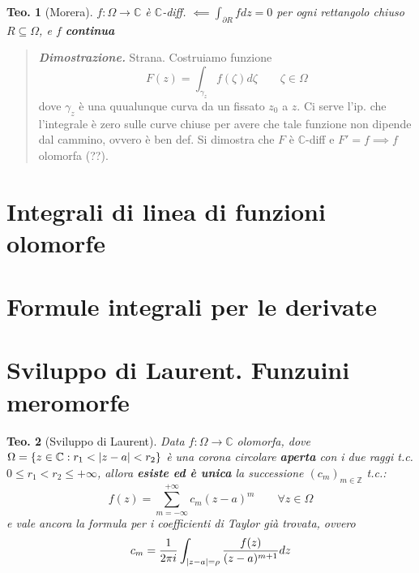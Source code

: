 \documentclass[a4paper,10pt]{article}
\newcommand{\im}{\mathbb{C}} %
\theoremstyle{indentdefinition}
\theoremstyle{indenttheorem}
\newtheorem{thm}{Teo.}
\theoremstyle{myremark}
\theoremstyle{indentgeneral}
\newenvironment{dimo}{\begin{quote}\textit{\textbf{Dimostrazione.}}}{\end{quote}} %
\begin{document}
\begin{thm}[Morera] $f:\Omega\to\im$ è $\im$-diff. $\impliedby\int_{\partial R}fdz=0$ per ogni rettangolo chiuso $R\subseteq \Omega$, e $f$ \textbf{continua}
\end{thm}

\begin{dimo}
    Strana. Costruiamo funzione
    $$F(z)=\int_{\gamma_z}f(\zeta)d\zeta \quad \quad \zeta\in\Omega$$
    dove $\gamma_z$ è una quualunque curva da un fissato $z_0$ a $z$. Ci serve l'ip. che l'integrale è zero sulle curve chiuse per avere che tale  funzione non dipende dal cammino, ovvero è ben  def. Si dimostra che $F$ è $\im$-diff e $F'=f\implies f$ olomorfa (??).
\end{dimo}

\section{Integrali di linea di funzioni olomorfe}

\section{Formule integrali per le derivate}

\section{Sviluppo di Laurent. Funzuini meromorfe}
\begin{thm}[Sviluppo di Laurent]
    Data $f:\Omega\to\im$ olomorfa, dove $\Omega=\{z\in\im:r_1<\abs{z-a}<r_2\}$ è una corona circolare \textbf{aperta} con i due raggi t.c. $0\le r_1 < r_2 \le +\infty$, allora \textbf{esiste ed è unica} la successione $(c_m)_{m\in\mathbb{Z}}$ t.c.:
    $$f(z)=\sum_{m=-\infty}^{+\infty}c_m(z-a)^m \quad \quad \forall z\in\Omega$$
    e vale ancora la formula per i coefficienti di Taylor già trovata, ovvero
    $$c_m=\frac{1}{2\pi i}\int_{\abs{z-a}=\rho}\frac{f(z)}{(z-a)^{m+1}}dz$$
\end{thm}
\end{document}
